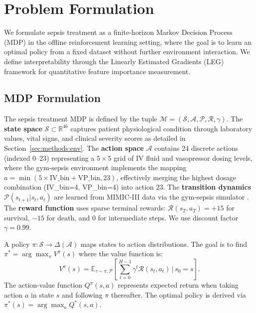 
\section{Problem Formulation}\label{sec:problem}

We formulate sepsis treatment as a finite-horizon Markov Decision Process (MDP) in the offline reinforcement learning setting, where the goal is to learn an optimal policy from a fixed dataset without further environment interaction. We define interpretability through the Linearly Estimated Gradients (LEG) framework for quantitative feature importance measurement.

\subsection{MDP Formulation}\label{sec:problem:mdp}

The sepsis treatment MDP is defined by the tuple $\mathcal{M} = (\mathcal{S}, \mathcal{A}, \mathcal{P}, \mathcal{R}, \gamma)$. The \textbf{state space} $\mathcal{S} \subset \mathbb{R}^{46}$ captures patient physiological condition through laboratory values, vital signs, and clinical severity scores as detailed in Section~\ref{sec:methods:env}. The \textbf{action space} $\mathcal{A}$ contains 24 discrete actions (indexed 0--23) representing a $5 \times 5$ grid of IV fluid and vasopressor dosing levels, where the gym-sepsis environment implements the mapping $a = \min(5 \times \text{IV\_bin} + \text{VP\_bin}, 23)$, effectively merging the highest dosage combination (IV\_bin=4, VP\_bin=4) into action 23. The \textbf{transition dynamics} $\mathcal{P}(s_{t+1} | s_t, a_t)$ are learned from MIMIC-III data via the gym-sepsis simulator \citep{raghu2017sepsis_drl}. The \textbf{reward function} uses sparse terminal rewards: $\mathcal{R}(s_T, a_T) = +15$ for survival, $-15$ for death, and $0$ for intermediate steps. We use discount factor $\gamma = 0.99$.

A policy $\pi: \mathcal{S} \to \Delta(\mathcal{A})$ maps states to action distributions. The goal is to find $\pi^* = \arg\max_\pi V^\pi(s)$ where the value function is:
\begin{equation}
V^\pi(s) = \mathbb{E}_{\tau \sim \pi, \mathcal{P}} \left[ \sum_{t=0}^{H-1} \gamma^t \mathcal{R}(s_t, a_t) \,\Big|\, s_0 = s \right].
\end{equation}
The action-value function $Q^\pi(s, a)$ represents expected return when taking action $a$ in state $s$ and following $\pi$ thereafter. The optimal policy is derived via $\pi^*(s) = \arg\max_a Q^*(s, a)$.


